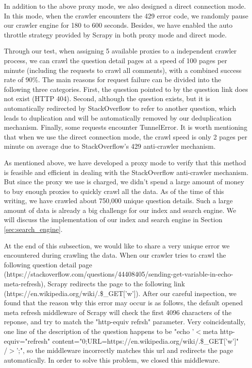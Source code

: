 \documentclass[10pt,journal,compsoc]{IEEEtran}
\begin{document}
In addition to the above proxy mode, we also designed a direct connection mode. In this mode, when the crawler encounters the 429 error code, we randomly pause our crawler engine for 180 to 600 seconds. Besides, we have enabled the auto throttle strategy provided by Scrapy in both proxy mode and direct mode.

Through our test, when assigning 5 available proxies to a independent crawler process, we can crawl the question detail pages at a speed of 100 pages per minute (including the requests to crawl all comments), with a combined success rate of 90\%. The main reasons for request failure can be divided into the following three categories. First, the question pointed to by the question link does not exist (HTTP 404). Second, although the question exists, but it is automatically redirected by StackOverflow to refer to another question, which leads to duplication and will be automatically removed by our deduplication mechanism. Finally, some requests encounter TunnelError. It is worth mentioning that when we use the direct connection mode, the crawl speed is only 2 pages per minute on average due to StackOverflow's 429 anti-crawler mechanism.

As mentioned above, we have developed a proxy mode to verify that this method is feasible and efficient in dealing with the StackOverflow anti-crawler mechanism. But since the proxy we use is charged, we didn't spend a large amount of money to buy enough proxies to quickly crawl all the data. As of the time of this writing, we have crawled about 750,000 unique question details. Such a large amount of data is already a big challenge for our index and search engine. We will discuss the implementation of our index and search engine in Section \ref{sec:search_engine}.

At the end of this subsection, we would like to share a very unique error we encountered during crawling the data. When our crawler tries to crawl the following question detail page  (https://stackoverflow.com/questions/44408405/sending-get-variable-in-echo-meta-refresh), Scrapy redirects the page to the following link (https://en.wikipedia.org/wiki/.\$\_GET['w']). After our careful inspection, we found that the reason why this error may occur is as follows, the default opened meta refresh middleware of Scrapy will check the first 4096 characters of the reponse, and try to match the "http-equiv refrsh" parameter. Very coincidentally, one line of the description of the question happens to be "echo '$<$meta http-equiv="refresh" content="0;URL=https://en.wikipedia.org/wiki/.\$\_GET['w']"\\/$>$';", so the middleware incorrectly matches this url and redirects the page automatically. In order to solve this problem, we closed this middleware.
\end{document}
